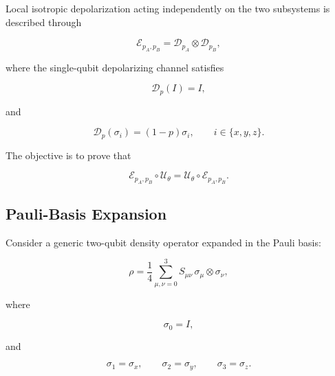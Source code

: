 \medskip

Local isotropic depolarization acting independently on the two subsystems is described through

\begin{equation}
\mathcal{E}_{p_A,p_B}
=
\mathcal{D}_{p_A}
\otimes
\mathcal{D}_{p_B},
\label{eq:appendix_local_depolarizing_channel}
\end{equation}

where the single-qubit depolarizing channel satisfies

\begin{equation}
\mathcal{D}_{p}(I)=I,
\label{eq:appendix_depolarization_identity}
\end{equation}

and

\begin{equation}
\mathcal{D}_{p}(\sigma_i)
=
(1-p)\sigma_i,
\qquad
i\in\{x,y,z\}.
\label{eq:appendix_depolarization_pauli}
\end{equation}

\medskip

The objective is to prove that

\begin{equation}
\mathcal{E}_{p_A,p_B}
\circ
\mathcal{U}_{\theta}
=
\mathcal{U}_{\theta}
\circ
\mathcal{E}_{p_A,p_B}.
\label{eq:appendix_commutation_statement}
\end{equation}


\subsection*{Pauli-Basis Expansion}

Consider a generic two-qubit density operator expanded in the Pauli basis:

\begin{equation}
\rho
=
\frac{1}{4}
\sum_{\mu,\nu=0}^{3}
S_{\mu\nu}\,
\sigma_{\mu}
\otimes
\sigma_{\nu},
\label{eq:appendix_pauli_expansion}
\end{equation}

where

\[
\sigma_0 = I,
\]

and

\[
\sigma_1=\sigma_x,
\qquad
\sigma_2=\sigma_y,
\qquad
\sigma_3=\sigma_z.
\]

\medskip

